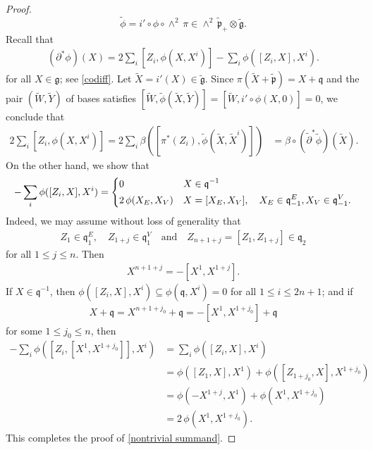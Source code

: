 \documentclass[11pt]{amsart}
\begin{document}
\begin{proof}
\[\tilde\phi
=i'\circ\phi\circ\wedge^2\,\pi\in\wedge^2\,\tilde{\mathfrak p}_+\otimes\tilde{\mathfrak g}.\]
Recall that
\begin{align*}
    (\partial^*\phi)(X)
    =2\sum_i[Z_i,\phi(X,X^i)]-\sum_i\phi([Z_i,X],X^i).
\end{align*}
for all $X\in\mathfrak g$; see \eqref{codiff}. Let $\tilde X=i'(X)\in \tilde{\mathfrak g}$. Since $\pi(\tilde X+\tilde{\mathfrak p})=X+\mathfrak q$ and the pair $(\tilde W,\tilde Y)$ of bases satisfies $[\tilde W,\tilde\phi(\tilde X,\tilde Y)]=[\tilde W,i'\circ\phi(X,0)]=0$, we conclude that
\begin{align}\label{Kostant relation for beta}
    2\sum_i[Z_i,\phi(X,X^i)]=2\sum_i \beta([\pi^*(Z_i),\tilde\phi(\tilde X,\tilde X^i)])
    &=\beta\circ(\tilde\partial^*\tilde\phi)(\tilde X).
\end{align}
On the other hand, we show that
\begin{equation}\label{nontrivial summand}
-\sum_i\phi([Z_i,X],X^i)=
\begin{aligned}   
\begin{dcases}   
0& X\in\mathfrak q^{-1}\\   
2\,\phi(X_E,X_V)& X=[X_E,X_V],\quad X_E\in\mathfrak q_{-1}^E,X_V\in\mathfrak q_{-1}^V.
\end{dcases}
\end{aligned}  
\end{equation}
Indeed, we may assume without loss of generality that
\begin{align*}    Z_1\in\mathfrak q_1^E,\quad Z_{1+j}\in\mathfrak q_1^V\quad\text{and}\quad Z_{n+1+j}=[Z_1,Z_{1+j}]\in\mathfrak q_2\end{align*} 
for all $1\leq j\leq n$. Then
\begin{align*}
    X^{n+1+j}=-[X^1,X^{1+j}].
\end{align*}
If $X\in\mathfrak q^{-1}$, then $\phi([Z_i,X],X^i)\subseteq\phi(\mathfrak q,X^i)=0$ for all $1\leq i\leq 2n+1$; and if 
\begin{align*}    X+\mathfrak q=X^{n+1+j_0}+\mathfrak q=-[X^1,X^{1+j_0}]+\mathfrak q
\end{align*}
for some $1\leq j_0\leq n$, then
\begin{align*}    
-\sum_i\phi([Z_i,[X^1,X^{1+j_0}]],X^i)&=\sum_i\phi([Z_i,X],X^i)  \\  &=\phi([Z_1,X],X^1)+\phi([Z_{1+j_0},X],X^{1+j_0})\\    &=\phi(-X^{1+j},X^1)+\phi(X^1,X^{1+j_0})\\    
&=2\,\phi(X^1,X^{1+j_0}).
\end{align*}
This completes the proof of \eqref{nontrivial summand}.


\end{proof}
\end{document}
